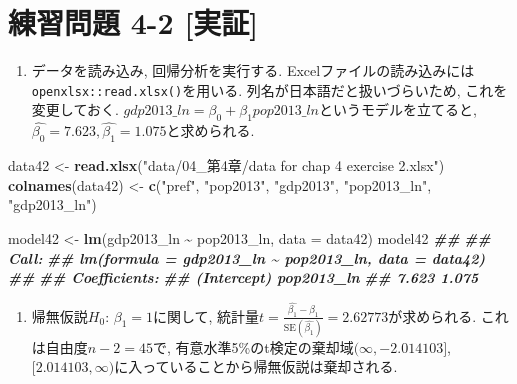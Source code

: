 \documentclass[
]{book}
\newenvironment{Shaded}{\begin{snugshade}}{\end{snugshade}}
\newcommand{\AttributeTok}[1]{\textcolor[rgb]{0.13,0.29,0.53}{#1}}
\newcommand{\DocumentationTok}[1]{\textcolor[rgb]{0.56,0.35,0.01}{\textbf{\textit{#1}}}}
\newcommand{\FunctionTok}[1]{\textcolor[rgb]{0.13,0.29,0.53}{\textbf{#1}}}
\newcommand{\NormalTok}[1]{#1}
\newcommand{\OtherTok}[1]{\textcolor[rgb]{0.56,0.35,0.01}{#1}}
\newcommand{\SpecialCharTok}[1]{\textcolor[rgb]{0.81,0.36,0.00}{\textbf{#1}}}
\newcommand{\StringTok}[1]{\textcolor[rgb]{0.31,0.60,0.02}{#1}}
\providecommand{\tightlist}{%
  \setlength{\itemsep}{0pt}\setlength{\parskip}{0pt}}
\begin{document}
\hypertarget{ux7df4ux7fd2ux554fux984c-4-2-ux5b9fux8a3c}{%
\section*{練習問題 4-2 {[}実証{]}}\label{ux7df4ux7fd2ux554fux984c-4-2-ux5b9fux8a3c}}

\begin{enumerate}
\def\labelenumi{(\arabic{enumi})}
\tightlist
\item
  データを読み込み, 回帰分析を実行する.
  Excelファイルの読み込みには\texttt{openxlsx::read.xlsx()}を用いる.
  列名が日本語だと扱いづらいため, これを変更しておく.
  \(gdp2013\_ln = \beta_0 + \beta_1 pop2013\_ln\)というモデルを立てると, \(\hat{\beta_0} = 7.623, \hat{\beta_1} = 1.075\)と求められる.
\end{enumerate}

\begin{Shaded}
\begin{Highlighting}[]
\NormalTok{data42 }\OtherTok{\textless{}{-}} \FunctionTok{read.xlsx}\NormalTok{(}\StringTok{"data/04\_第4章/data for chap 4 exercise 2.xlsx"}\NormalTok{)}
\FunctionTok{colnames}\NormalTok{(data42) }\OtherTok{\textless{}{-}} \FunctionTok{c}\NormalTok{(}\StringTok{"pref"}\NormalTok{, }\StringTok{"pop2013"}\NormalTok{, }\StringTok{"gdp2013"}\NormalTok{, }\StringTok{"pop2013\_ln"}\NormalTok{, }\StringTok{"gdp2013\_ln"}\NormalTok{)}

\NormalTok{model42 }\OtherTok{\textless{}{-}} \FunctionTok{lm}\NormalTok{(gdp2013\_ln }\SpecialCharTok{\textasciitilde{}}\NormalTok{ pop2013\_ln, }\AttributeTok{data =}\NormalTok{ data42)}
\NormalTok{model42}
\DocumentationTok{\#\# }
\DocumentationTok{\#\# Call:}
\DocumentationTok{\#\# lm(formula = gdp2013\_ln \textasciitilde{} pop2013\_ln, data = data42)}
\DocumentationTok{\#\# }
\DocumentationTok{\#\# Coefficients:}
\DocumentationTok{\#\# (Intercept)   pop2013\_ln  }
\DocumentationTok{\#\#       7.623        1.075}
\end{Highlighting}
\end{Shaded}

\begin{enumerate}
\def\labelenumi{(\arabic{enumi})}
\setcounter{enumi}{1}
\tightlist
\item
  帰無仮説\(H_0\): \(\beta_1 = 1\)に関して, 統計量\(t = \frac{\hat{\beta_1} - \beta_1}{\text{SE}(\hat{\beta_1})} = 2.62773\)が求められる.
  これは自由度\(n-2 = 45\)で, 有意水準5\%のt検定の棄却域\((\infty, -2.014103]\), \([2.014103, \infty)\)に入っていることから帰無仮説は棄却される.
\end{enumerate}
\end{document}
